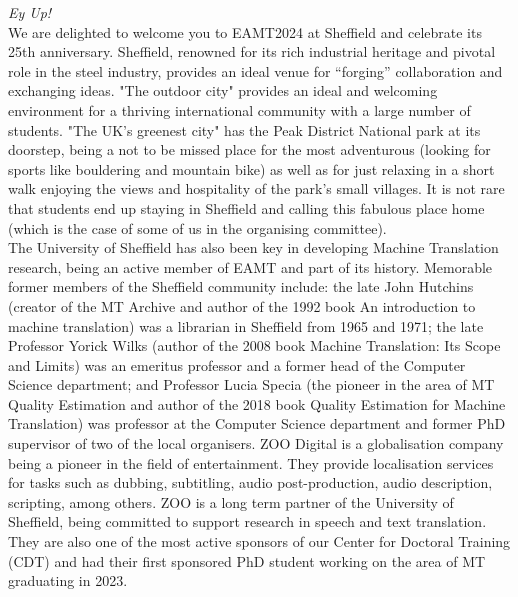 \textit{Ey Up!}
\\

We are delighted to welcome you to EAMT2024 at Sheffield and celebrate its 25th anniversary. Sheffield, renowned for its rich industrial heritage and pivotal role in the steel industry, provides an ideal venue for “forging” collaboration and exchanging ideas. "The outdoor city" provides an ideal and welcoming environment for a thriving international community with a large number of students. "The UK's greenest city" has the Peak District National park at its doorstep, being a not to be missed place for the most adventurous (looking for sports like bouldering and mountain bike) as well as for just relaxing in a short walk enjoying the views and hospitality of the park's small villages. It is not rare that students end up staying in Sheffield and calling this fabulous place home (which is the case of some of us in the organising committee). 
\\

The University of Sheffield has also been key in developing Machine Translation research, being an active member of EAMT and part of its history. Memorable former members of the Sheffield community include: the late John Hutchins (creator of the MT Archive and author of the 1992 book An introduction to machine translation) was a librarian in Sheffield from 1965 and 1971; the late Professor Yorick Wilks (author of the 2008 book Machine Translation: Its Scope and Limits) was an emeritus professor and a former head of the Computer Science department; and Professor Lucia Specia (the pioneer in the area of MT Quality Estimation and author of the 2018 book Quality Estimation for Machine Translation) was professor at the Computer Science department and former PhD supervisor of two of the local organisers. 
ZOO Digital is a globalisation company being a pioneer in the field of entertainment. They provide localisation services for tasks such as dubbing, subtitling, audio post-production, audio description, scripting, among others. ZOO is a long term partner of the University of Sheffield, being committed to support research in speech and text translation. They are also one of the most active sponsors of our Center for Doctoral Training (CDT) and had their first sponsored PhD student working on the area of MT graduating in 2023. 
\\

